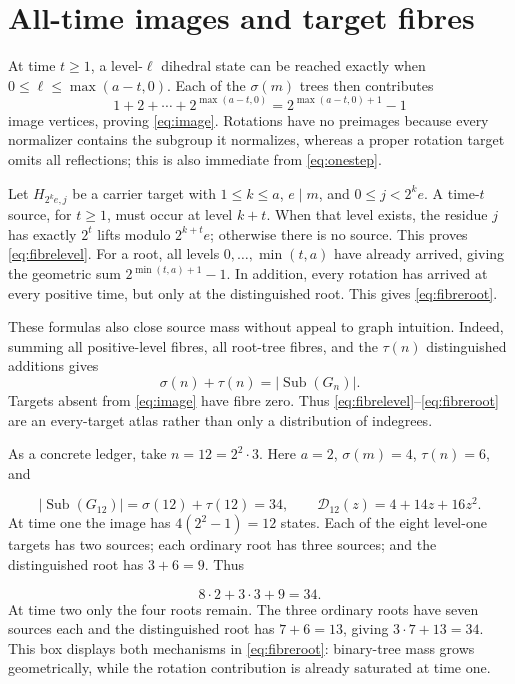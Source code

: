\documentclass[10pt,a4paper]{amsart}
\theoremstyle{remark}
\newcommand{\Sub}{\operatorname{Sub}}
\begin{document}
\section{All-time images and target fibres}

At time \(t\geq1\), a level-\(\ell\) dihedral state can be reached exactly
when \(0\leq\ell\leq\max(a-t,0)\).  Each of the \(\sigma(m)\) trees then
contributes
\[
1+2+\cdots+2^{\max(a-t,0)}
=2^{\max(a-t,0)+1}-1
\]
image vertices, proving \eqref{eq:image}.  Rotations have no preimages
because every normalizer contains the subgroup it normalizes, whereas a
proper rotation target omits all reflections; this is also immediate from
\eqref{eq:onestep}.

Let \(H_{2^ke,j}\) be a carrier target with \(1\leq k\leq a\), \(e\mid m\),
and \(0\leq j<2^ke\).  A time-\(t\) source, for \(t\geq1\), must
occur at level \(k+t\).  When that level exists, the residue \(j\) has exactly
\(2^t\) lifts modulo \(2^{k+t}e\); otherwise there is no source.  This proves
\eqref{eq:fibrelevel}.  For a root, all levels \(0,\ldots,\min(t,a)\) have
already arrived, giving the geometric sum
\(2^{\min(t,a)+1}-1\).  In addition, every rotation has arrived at every
positive time, but only at the distinguished root.  This gives
\eqref{eq:fibreroot}.

These formulas also close source mass without appeal to graph intuition.
Indeed, summing all positive-level fibres, all root-tree fibres, and the
\(\tau(n)\) distinguished additions gives
\[
\sigma(n)+\tau(n)=|\Sub(G_n)|.
\]
Targets absent from \eqref{eq:image} have fibre zero.  Thus
\eqref{eq:fibrelevel}--\eqref{eq:fibreroot} are an every-target atlas rather
than only a distribution of indegrees.

As a concrete ledger, take \(n=12=2^2\cdot3\).  Here
\(a=2\), \(\sigma(m)=4\), \(\tau(n)=6\), and

\[
|\Sub(G_{12})|=\sigma(12)+\tau(12)=34,\qquad
\mathcal D_{12}(z)=4+14z+16z^2.                       \tag{11}\label{eq:n12depth}
\]
At time one the image has \(4(2^2-1)=12\) states.  Each of the eight
level-one targets has two sources; each ordinary root has three sources; and
the distinguished root has \(3+6=9\).  Thus

\[
8\cdot2+3\cdot3+9=34.
\]
At time two only the four roots remain.  The three ordinary roots have seven
sources each and the distinguished root has \(7+6=13\), giving
\(3\cdot7+13=34\).  This box displays both mechanisms in
\eqref{eq:fibreroot}: binary-tree mass grows geometrically, while the
rotation contribution is already saturated at time one.
\end{document}
